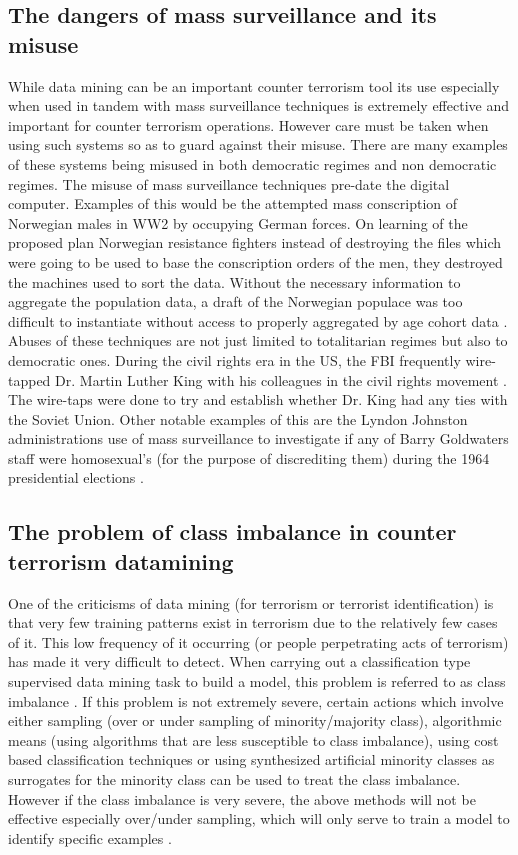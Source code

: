 \subsection{The dangers of mass surveillance and its misuse}
While data mining can be an important counter terrorism tool its use especially when used in tandem with mass surveillance techniques is extremely effective and important for counter terrorism operations. However care must be taken when using such systems so as to guard against their misuse. There are many examples of these systems being misused in both democratic regimes and non democratic regimes. The misuse of mass surveillance techniques pre-date the digital computer. Examples of this would  be the attempted mass conscription of Norwegian males in WW2 by occupying German forces. On learning of the proposed plan Norwegian resistance fighters instead of destroying the files which were going to be used to base the conscription orders of the men, they destroyed the machines used to sort the data. Without the necessary information to aggregate the population data, a draft of the Norwegian populace was too difficult to instantiate without access to properly aggregated by age cohort data \citep{bignami2007european}. Abuses of these techniques are not just limited to totalitarian regimes but also to democratic ones. During the civil rights era in the US, the FBI frequently wire-tapped Dr. Martin Luther King with his colleagues in the civil rights movement \citep{garrow2015fbi}. The wire-taps were done to try and establish whether Dr. King had any ties with the Soviet Union. Other notable examples of this are the Lyndon Johnston administrations use of mass surveillance to investigate if any of Barry Goldwaters staff were homosexual's (for the purpose of discrediting them) during the 1964 presidential elections \citep{sales2014domesticating}.

\subsection{The problem of class imbalance in counter terrorism datamining} 
One of the criticisms of data mining (for terrorism or terrorist identification) is that very few training patterns exist in terrorism due to the relatively few cases of it. This low frequency of it occurring (or people perpetrating acts of terrorism) has made it very difficult to detect. When carrying out a classification type supervised data mining task to build a model, this problem is referred to as class imbalance \citep{SASClassimbalance2015}. If this problem is not extremely severe, certain actions which involve either sampling (over or under sampling of minority/majority class), algorithmic means (using algorithms that are less susceptible to class imbalance), using cost based classification techniques or using synthesized artificial minority classes as surrogates for the minority class can be used to treat the class imbalance. However if the class imbalance is very severe, the above methods will not be effective especially over/under sampling, which will only serve to train a model to identify specific examples \citep{jonas2006effective}.

